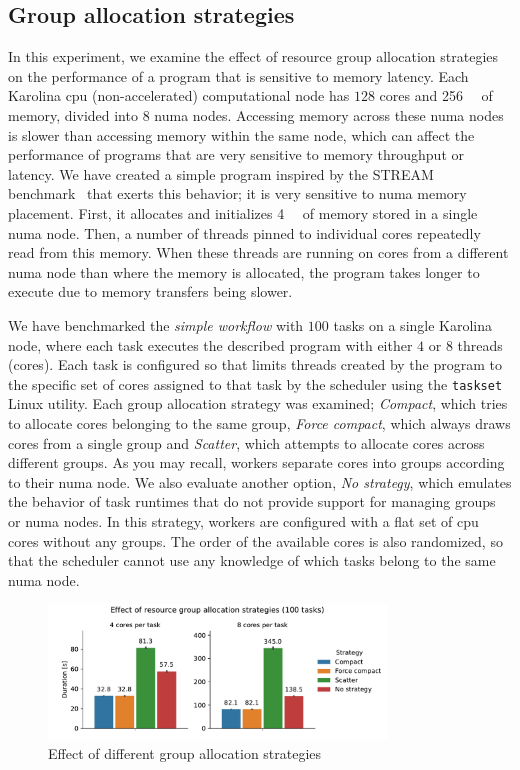 \subsection{Group allocation strategies}
\label{sec:hq-exp-numa}
In this experiment, we examine the effect of resource group allocation strategies on the
performance of a program that is sensitive to memory latency. Each Karolina \gls{cpu} (non-accelerated)
computational node has $128$ cores and \SI{256}{\gibi\byte} of memory, divided
into $8$ \gls{numa} nodes. Accessing memory across these
\gls{numa} nodes is slower than accessing memory within the same node, which can
affect the performance of programs that are very sensitive to memory throughput or latency. We have
created a simple program inspired by the STREAM benchmark~\cite{stream} that exerts this
behavior; it is very sensitive to \gls{numa} memory placement. First, it allocates and
initializes \SI{4}{\gibi\byte} of memory stored in a single \gls{numa} node.
Then, a number of threads pinned to individual cores repeatedly read from this memory. When these
threads are running on cores from a different \gls{numa} node than where the memory is
allocated, the program takes longer to execute due to memory transfers being slower.

We have benchmarked the \emph{simple workflow} with $100$ tasks on a single
Karolina node, where each task executes the described program with either $4$
or $8$ threads (cores). Each task is configured so that \hyperqueue{}
limits threads created by the program to the specific set of cores assigned to that task by the
scheduler using the \texttt{taskset} Linux utility. Each group allocation strategy was examined;
\emph{Compact}, which tries to allocate cores belonging to the same group,
\emph{Force compact}, which always draws cores from a single group and \emph{Scatter},
which attempts to allocate cores across different groups. As you may recall,
\hyperqueue{} workers separate cores into groups according to their
\gls{numa} node. We also evaluate another option, \emph{No strategy}, which
emulates the behavior of task runtimes that do not provide support for managing groups or
\gls{numa} nodes. In this strategy, workers are configured with a flat set of \gls{cpu}
cores without any groups. The order of the available cores is also randomized, so that the
scheduler cannot use any knowledge of which tasks belong to the same \gls{numa} node.

\begin{figure}[h]
	\centering
	\includegraphics[width=0.8\textwidth]{imgs/hq/charts/numa}
	\caption{Effect of different group allocation strategies}
	\label{fig:hq-numa}
\end{figure}

